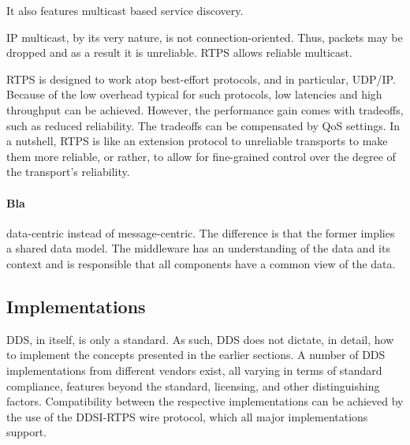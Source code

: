 It also features multicast based service discovery.

IP multicast, by its very nature, is not connection-oriented. Thus, packets may be dropped and as a result it is unreliable. RTPS allows reliable multicast.

RTPS is designed to work atop best-effort protocols, and in particular, UDP/IP. Because of the low overhead typical for such protocols, low latencies and high throughput can be achieved. However, the performance gain comes with tradeoffs, such as reduced reliability. The tradeoffs can be compensated by QoS settings. In a nutshell, RTPS is like an extension protocol to unreliable transports to make them more reliable, or rather, to allow for fine-grained control over the degree of the transport's reliability.



\paragraph{Bla}

data-centric instead of message-centric. The difference is that the former implies a shared data model. The middleware has an understanding of the data and its context and is responsible that all components have a common view of the data.

\subsection{Implementations}
DDS, in itself, is only a standard. As such, DDS does not dictate, in detail, how to implement the concepts presented in the earlier sections. A number of DDS implementations from different vendors exist, all varying in terms of standard compliance, features beyond the standard, licensing, and other distinguishing factors. Compatibility between the respective implementations can be achieved by the use of the DDSI-RTPS wire protocol, which all major implementations support.


%
%
%
%
%
%
%
%
%
%
%
%
%
%
